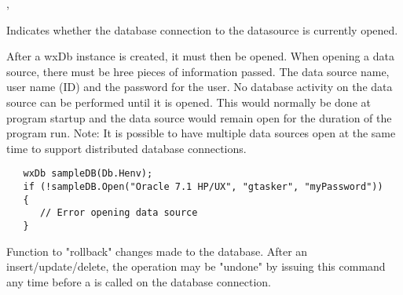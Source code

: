 
, 


\label{wxdbisopen}


Indicates whether the database connection to the datasource is currently opened.

\label{wxdbopen}





After a wxDb instance is created, it must then be opened.  When opening a data source, there must be hree pieces of information passed.  The data source name, user name (ID) and the password for the user.  No database activity on the data source can be performed until it is opened.  This would normally be done at program startup and the data source would remain open for the duration of the program run.  Note: It is possible to have multiple data sources open at the same time to support distributed database connections. 

\begin{verbatim}
   wxDb sampleDB(Db.Henv);
   if (!sampleDB.Open("Oracle 7.1 HP/UX", "gtasker", "myPassword"))
   {
      // Error opening data source
   }
\end{verbatim}


\label{wxdbrollbacktrans}


Function to "rollback" changes made to the database.  After an insert/update/delete, the operation may be "undone" by issuing this command any time before a  is called on the database connection.

